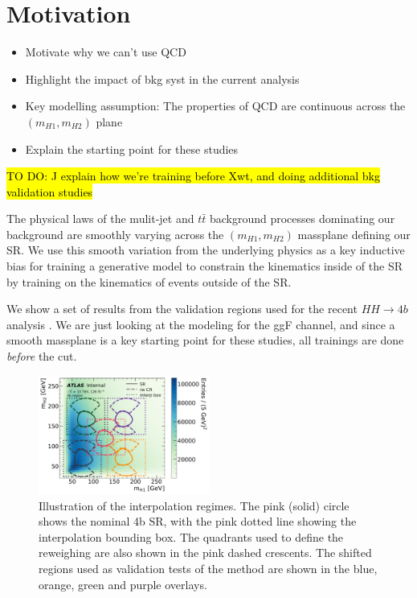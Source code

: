 \section{Motivation}
\label{sec:motivation}

\begin{itemize}
	\item Motivate why we can't use QCD
	\item Highlight the impact of bkg syst in the current analysis
	\item Key modelling assumption: The properties of QCD are continuous across the $(m_{H1},m_{H2})$ plane
	\item Explain the starting point for these studies
\end{itemize}

\hl{TO DO: J explain how we're training before Xwt, and doing additional bkg validation studies}

The physical laws of the mulit-jet and $t\bar{t}$  background processes dominating our background are smoothly varying across the $(m_{H1}, m_{H2})$ massplane defining our SR.  We use this smooth variation from the underlying physics as a key inductive bias for training a generative model to constrain the \HH kinematics inside of the SR by training on the kinematics of events outside of the SR.

We show a set of results from the validation regions used for the recent $HH \rightarrow 4b$ analysis \cite{HDBS-2019-29}.
We are just looking at the modeling for the ggF channel, and since a smooth massplane is a key starting point for these studies, all trainings are done \emph{before} the \Xwt cut.


\begin{figure}[ht]
    \centering
    \includegraphics[width=0.5\textwidth]{figures/flows/fullmassplane_shift_regs_all}  
    \caption{ Illustration of the interpolation regimes. The pink (solid) circle shows the nominal 4b SR, with the pink dotted line showing the interpolation bounding box. The quadrants used to define the reweighing are also shown in the pink dashed crescents. The shifted regions used as validation tests of the method are shown in the blue, orange, green and purple overlays. }
    \label{fig:fullmassplane-shift-regs}
\end{figure}


